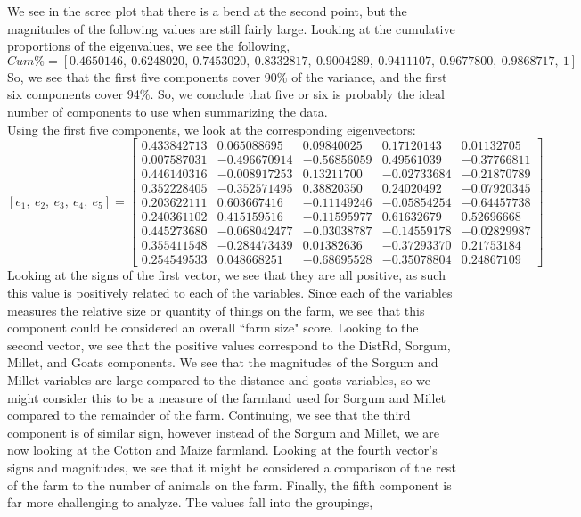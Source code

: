 \documentclass[letterpaper,10pt]{article}
\begin{document}
\begin{enumerate}
\begin{center}
\end{center}
We see in the scree plot that there is a bend at the second point, but the magnitudes of the following values are still fairly large. Looking at the cumulative proportions of the eigenvalues, we see the following,
\[Cum\% = [0.4650146,\ 0.6248020,\ 0.7453020,\ 0.8332817,\ 0.9004289,\ 0.9411107,\ 0.9677800,\ 0.9868717,\ 1]\]
So, we see that the first five components cover 90\% of the variance, and the first six components cover 94\%. So, we conclude that five or six is probably the ideal number of components to use when summarizing the data.\\
Using the first five components, we look at the corresponding eigenvectors:
\[[e_1,\ e_2,\ e_3,\ e_4,\ e_5]=\begin{bmatrix}
0.433842713 & 0.065088695 & 0.09840025 & 0.17120143 & 0.01132705\\
0.007587031 & -0.496670914 & -0.56856059 & 0.49561039 & -0.37766811\\
0.446140316 & -0.008917253 & 0.13211700 & -0.02733684 & -0.21870789\\
0.352228405 & -0.352571495 & 0.38820350 & 0.24020492 & -0.07920345\\
0.203622111 & 0.603667416 & -0.11149246 & -0.05854254 & -0.64457738\\
0.240361102 & 0.415159516 & -0.11595977 & 0.61632679 & 0.52696668\\
0.445273680 & -0.068042477 & -0.03038787 & -0.14559178 & -0.02829987\\
0.355411548 & -0.284473439 & 0.01382636 & -0.37293370 & 0.21753184\\
0.254549533 & 0.048668251 & -0.68695528 & -0.35078804 & 0.24867109
\end{bmatrix} \]
Looking at the signs of the first vector, we see that they are all positive, as such this value is positively related to each of the variables. Since each of the variables measures the relative size or quantity of things on the farm, we see that this component could be considered an overall ``farm size" score. Looking to the second vector, we see that the positive values correspond to the DistRd, Sorgum, Millet, and Goats components. We see that the magnitudes of the Sorgum and Millet variables are large compared to the distance and goats variables, so we might consider this to be a measure of the farmland used for Sorgum and Millet compared to the remainder of the farm. Continuing, we see that the third component is of similar sign, however instead of the Sorgum and Millet, we are now looking at the Cotton and Maize farmland. Looking at the fourth vector's signs and magnitudes, we see that it might be considered a comparison of the rest of the farm to the number of animals on the farm. Finally, the fifth component is far more challenging to analyze. The values fall into the groupings,

\end{enumerate}
\end{document}
